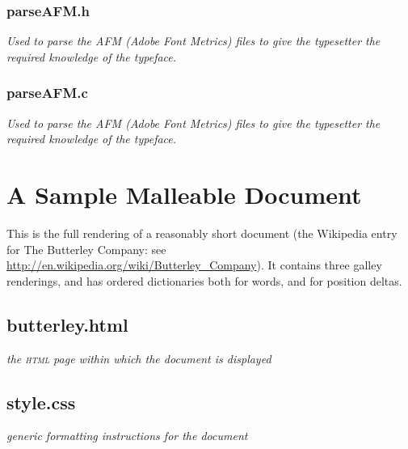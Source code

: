 \newpage

\subsection{parseAFM.h}
\emph{Used to parse the AFM (Adobe Font Metrics) files to give the typesetter the required knowledge of the typeface.}


\newpage

\subsection{parseAFM.c}
\emph{Used to parse the AFM (Adobe Font Metrics) files to give the typesetter the required knowledge of the typeface.}


\newpage

\cleardoublepage
\chapter{A Sample Malleable Document}
\label{app:sampledoc}

This is the full rendering of a reasonably short document (the Wikipedia entry for The Butterley Company: see \url{http://en.wikipedia.org/wiki/Butterley_Company}). It contains three galley renderings, and has ordered dictionaries both for words, and for position deltas.

\section{butterley.html}
\emph{the \textsc{html} page within which the document is displayed}


\section{style.css}
\emph{generic formatting instructions for the document}

\newpage

